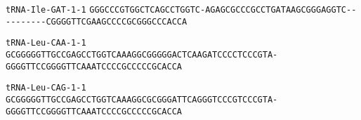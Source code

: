 \documentclass{article}
\newcommand{\rnabox}[1]{\colorbox{#1}{\texttt{#1}}}
\begin{document}
\vspace{-0.5mm}

\texttt{tRNA-Ile-GAT-1-1}
\rnabox{G}\rnabox{G}\rnabox{G}\rnabox{C}\rnabox{C}\rnabox{C}\rnabox{G}\rnabox{T}\rnabox{G}\rnabox{G}\rnabox{C}\rnabox{T}\rnabox{C}\rnabox{A}\rnabox{G}\rnabox{C}\rnabox{C}\rnabox{T}\rnabox{G}\rnabox{G}\rnabox{T}\rnabox{C}\rnabox{-}\rnabox{A}\rnabox{G}\rnabox{A}\rnabox{G}\rnabox{C}\rnabox{G}\rnabox{C}\rnabox{C}\rnabox{C}\rnabox{G}\rnabox{C}\rnabox{C}\rnabox{T}\rnabox{G}\rnabox{A}\rnabox{T}\rnabox{A}\rnabox{A}\rnabox{G}\rnabox{C}\rnabox{G}\rnabox{G}\rnabox{G}\rnabox{A}\rnabox{G}\rnabox{G}\rnabox{T}\rnabox{C}\rnabox{-}\rnabox{-}\rnabox{-}\rnabox{-}\rnabox{-}\rnabox{-}\rnabox{-}\rnabox{-}\rnabox{-}\rnabox{-}\rnabox{C}\rnabox{G}\rnabox{G}\rnabox{G}\rnabox{G}\rnabox{T}\rnabox{T}\rnabox{C}\rnabox{G}\rnabox{A}\rnabox{A}\rnabox{G}\rnabox{C}\rnabox{C}\rnabox{C}\rnabox{C}\rnabox{G}\rnabox{C}\rnabox{G}\rnabox{G}\rnabox{G}\rnabox{C}\rnabox{C}\rnabox{C}\rnabox{A}\rnabox{C}\rnabox{C}\rnabox{A}

\vspace{-0.5mm}

\texttt{tRNA-Leu-CAA-1-1}
\rnabox{G}\rnabox{C}\rnabox{G}\rnabox{G}\rnabox{G}\rnabox{G}\rnabox{G}\rnabox{T}\rnabox{T}\rnabox{G}\rnabox{C}\rnabox{C}\rnabox{G}\rnabox{A}\rnabox{G}\rnabox{C}\rnabox{C}\rnabox{T}\rnabox{G}\rnabox{G}\rnabox{T}\rnabox{C}\rnabox{A}\rnabox{A}\rnabox{A}\rnabox{G}\rnabox{G}\rnabox{C}\rnabox{G}\rnabox{G}\rnabox{G}\rnabox{G}\rnabox{G}\rnabox{A}\rnabox{C}\rnabox{T}\rnabox{C}\rnabox{A}\rnabox{A}\rnabox{G}\rnabox{A}\rnabox{T}\rnabox{C}\rnabox{C}\rnabox{C}\rnabox{C}\rnabox{T}\rnabox{C}\rnabox{C}\rnabox{C}\rnabox{G}\rnabox{T}\rnabox{A}\rnabox{-}\rnabox{G}\rnabox{G}\rnabox{G}\rnabox{G}\rnabox{T}\rnabox{T}\rnabox{C}\rnabox{C}\rnabox{G}\rnabox{G}\rnabox{G}\rnabox{G}\rnabox{T}\rnabox{T}\rnabox{C}\rnabox{A}\rnabox{A}\rnabox{A}\rnabox{T}\rnabox{C}\rnabox{C}\rnabox{C}\rnabox{C}\rnabox{G}\rnabox{C}\rnabox{C}\rnabox{C}\rnabox{C}\rnabox{C}\rnabox{G}\rnabox{C}\rnabox{A}\rnabox{C}\rnabox{C}\rnabox{A}

\vspace{-0.5mm}

\texttt{tRNA-Leu-CAG-1-1}
\rnabox{G}\rnabox{C}\rnabox{G}\rnabox{G}\rnabox{G}\rnabox{G}\rnabox{G}\rnabox{T}\rnabox{T}\rnabox{G}\rnabox{C}\rnabox{C}\rnabox{G}\rnabox{A}\rnabox{G}\rnabox{C}\rnabox{C}\rnabox{T}\rnabox{G}\rnabox{G}\rnabox{T}\rnabox{C}\rnabox{A}\rnabox{A}\rnabox{A}\rnabox{G}\rnabox{G}\rnabox{C}\rnabox{G}\rnabox{C}\rnabox{G}\rnabox{G}\rnabox{G}\rnabox{A}\rnabox{T}\rnabox{T}\rnabox{C}\rnabox{A}\rnabox{G}\rnabox{G}\rnabox{G}\rnabox{T}\rnabox{C}\rnabox{C}\rnabox{C}\rnabox{G}\rnabox{T}\rnabox{C}\rnabox{C}\rnabox{C}\rnabox{G}\rnabox{T}\rnabox{A}\rnabox{-}\rnabox{G}\rnabox{G}\rnabox{G}\rnabox{G}\rnabox{T}\rnabox{T}\rnabox{C}\rnabox{C}\rnabox{G}\rnabox{G}\rnabox{G}\rnabox{G}\rnabox{T}\rnabox{T}\rnabox{C}\rnabox{A}\rnabox{A}\rnabox{A}\rnabox{T}\rnabox{C}\rnabox{C}\rnabox{C}\rnabox{C}\rnabox{G}\rnabox{C}\rnabox{C}\rnabox{C}\rnabox{C}\rnabox{C}\rnabox{G}\rnabox{C}\rnabox{A}\rnabox{C}\rnabox{C}\rnabox{A}
\end{document}
